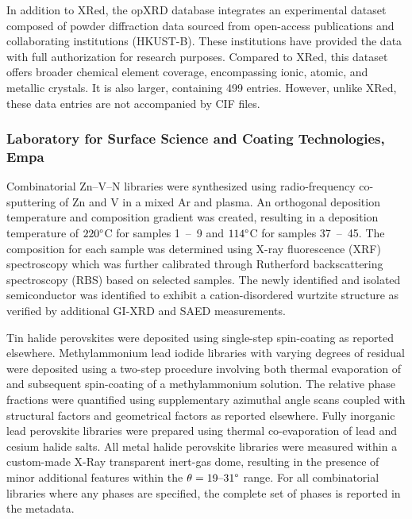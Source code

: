 In addition to XRed, the opXRD database integrates an experimental dataset composed of powder diffraction data sourced from open-access publications and collaborating institutions (HKUST-B). These institutions have provided the data with full authorization for research purposes. Compared to XRed, this dataset offers broader chemical element coverage, encompassing ionic, atomic, and metallic crystals. It is also larger, containing 499 entries. However, unlike XRed, these data entries are not accompanied by CIF files.


\subsubsection*{Laboratory for Surface Science and Coating Technologies, Empa}

Combinatorial Zn–V–N libraries were synthesized using radio-frequency co-sputtering of Zn and V in a mixed Ar and  plasma. An orthogonal deposition temperature and composition gradient was created, resulting in a deposition temperature of $220\degree$C for samples 1~–~9 and $114\degree$C for samples 37~–~45. The composition for each sample was determined using X-ray fluorescence (XRF) spectroscopy which was further calibrated through Rutherford backscattering spectroscopy (RBS) based on selected samples. The newly identified and isolated semiconductor  was identified to exhibit a cation-disordered wurtzite structure as verified by additional GI-XRD and SAED measurements\cite{Zhuk2021}.

Tin halide perovskites were deposited using single-step spin-coating as reported elsewhere\cite{Wieczorek2023}. Methylammonium lead iodide libraries with varying degrees of residual  were deposited using a two-step procedure involving both thermal evaporation of  and subsequent spin-coating of a methylammonium solution. The relative phase fractions were quantified using supplementary azimuthal angle scans coupled with structural factors and geometrical factors as reported elsewhere\cite{Wieczorek2024}. Fully inorganic lead perovskite libraries were prepared using thermal co-evaporation of lead and cesium halide salts. All metal halide perovskite libraries were measured within a custom-made X-Ray transparent inert-gas dome, resulting in the presence of minor additional features within the $\theta=19 \text{–}31\degree$ range. For all combinatorial libraries where any phases are specified, the complete set of phases is reported in the metadata.

